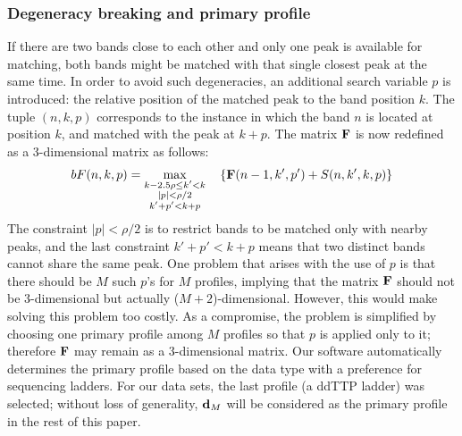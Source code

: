 \subsubsection{Degeneracy breaking and primary profile}\label{sss:primary_profile}
 If there are two bands close to each other and only one peak is available for matching, both bands might be matched with that single closest peak at the same time. In order to avoid such degeneracies, an additional search variable $p$ is introduced: the relative position of the matched peak to the band position $k$. The tuple $(n,k,p)$ corresponds to the instance in which the band $n$ is located at position $k$, and matched with the peak at $k+p$. The matrix ${\mathbf{F}}$ is now redefined as a 3-dimensional matrix as follows:
%
\begin{equation}\label{e:F2}
bF(n,k,p) = \max_{\substack{k-2.5\rho \le k' < k\\|p| < \rho/2\\k'+p' < k+p}}\quad \left\{ {\mathbf{F}}(n-1,k',p') + S(n,k',k,p) \right\}
\end{equation}
%
The constraint $|p| < \rho/2$ is to restrict bands to be matched only with nearby peaks, and the last constraint $k'+p'<k+p$ means that two distinct bands cannot share the same peak. One problem that arises with the use of $p$ is that there should be $M$ such $p$'s for $M$ profiles, implying that the matrix ${\mathbf{F}}$ should not be 3-dimensional but actually ($M+2$)-dimensional. However, this would make solving this problem too costly. As a compromise, the problem is simplified by choosing one primary profile among $M$ profiles so that $p$ is applied only to it; therefore ${\mathbf{F}}$ may remain as a 3-dimensional matrix. Our software automatically determines the primary profile based on the data type with a preference for sequencing ladders. For our data sets, the last profile (a ddTTP ladder) was selected; without loss of generality, ${\mathbf{d}}_M$ will be considered as the primary profile in the rest of this paper.

